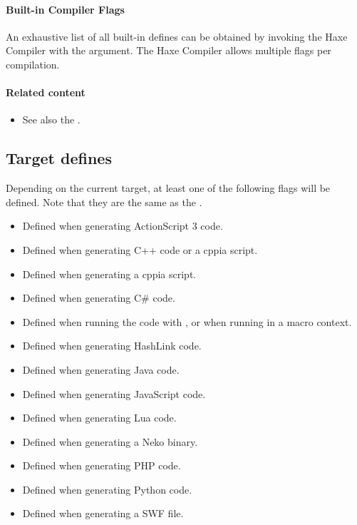 \paragraph{Built-in Compiler Flags}
An exhaustive list of all built-in defines can be obtained by invoking the Haxe Compiler with the  argument. The Haxe Compiler allows multiple  flags per compilation.

\paragraph{Related content}
\begin{itemize}
	\item See also the .
\end{itemize}

\subsection{Target defines}
\label{lf-target-defines}

Depending on the current target, at least one of the following flags will be defined. Note that they are the same as the .

\begin{itemize}
	\item[\ic{as3}] Defined when generating ActionScript 3 code.
	\item[\ic{cpp}] Defined when generating C++ code or a cppia script.
	\item[\ic{cppia}] Defined when generating a cppia script.
	\item[\ic{cs}] Defined when generating C\# code.
	\item[\ic{eval}] Defined when running the code with , or when running in a macro context.
	\item[\ic{hl}] Defined when generating HashLink code.
	\item[\ic{java}] Defined when generating Java code.
	\item[\ic{js}] Defined when generating JavaScript code.
	\item[\ic{lua}] Defined when generating Lua code.
	\item[\ic{neko}] Defined when generating a Neko binary.
	\item[\ic{php}] Defined when generating PHP code.
	\item[\ic{python}] Defined when generating Python code.
	\item[\ic{swf}] Defined when generating a SWF file.
\end{itemize}

